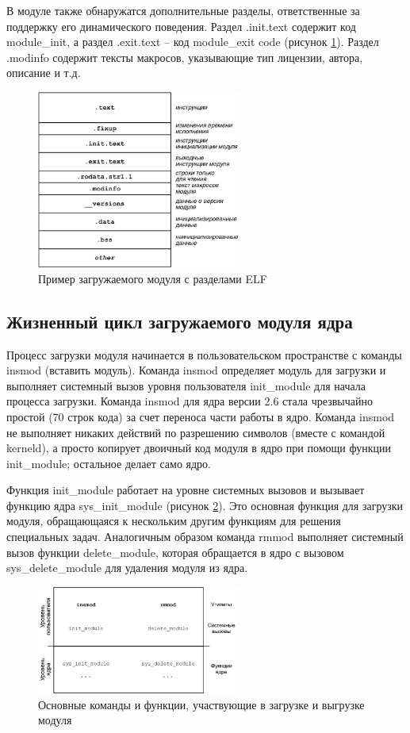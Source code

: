 В модуле также обнаружатся дополнительные разделы, ответственные за поддержку его динамического поведения. Раздел .init.text содержит код module\_init, а раздел .exit.text – код module\_exit code (рисунок  \ref{fig:an02}). Раздел .modinfo содержит тексты макросов, указывающие тип лицензии, автора, описание и т.д.
\begin{figure}[h!]
	\centering
	\includegraphics[width=0.6\textwidth]{img/2.png}
	\caption{Пример загружаемого модуля с разделами ELF}
	\label{fig:an02}
\end{figure}
\subsection{Жизненный цикл загружаемого модуля ядра}
Процесс загрузки модуля начинается в пользовательском пространстве с команды insmod (вставить модуль). Команда insmod определяет модуль для загрузки и выполняет системный вызов уровня пользователя init\_module для начала процесса загрузки. Команда insmod для ядра версии 2.6 стала чрезвычайно простой (70 строк кода) за счет переноса части работы в ядро. Команда insmod не выполняет никаких действий по разрешению символов (вместе с командой kerneld), а просто копирует двоичный код модуля в ядро при помощи функции init\_module; остальное делает само ядро.

Функция init\_module работает на уровне системных вызовов и вызывает функцию ядра sys\_init\_module (рисунок  \ref{fig:an03}). Это основная функция для загрузки модуля, обращающаяся к нескольким другим функциям для решения специальных задач. Аналогичным образом команда rmmod выполняет системный вызов функции delete\_module, которая обращается в ядро с вызовом sys\_delete\_module для удаления модуля из ядра.
\begin{figure}[h!]
	\centering
	\includegraphics[width=0.6\textwidth]{img/3.png}
	\caption{ Основные команды и функции, участвующие в загрузке и выгрузке модуля}
	\label{fig:an03}
\end{figure}
